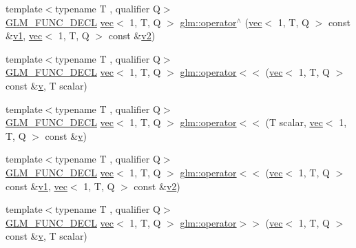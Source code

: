 \begin{DoxyCompactItemize}
\item 
{\footnotesize template$<$typename T , qualifier Q$>$ }\\\hyperlink{setup_8hpp_ab2d052de21a70539923e9bcbf6e83a51}{G\+L\+M\+\_\+\+F\+U\+N\+C\+\_\+\+D\+E\+CL} \hyperlink{structglm_1_1vec}{vec}$<$ 1, T, Q $>$ \hyperlink{group__ext__vec1_gaf70fee42d06c335b281793ffc5864b3e}{glm\+::operator$^\wedge$} (\hyperlink{structglm_1_1vec}{vec}$<$ 1, T, Q $>$ const \&\hyperlink{_s_d_l__opengl__glext_8h_a435c176a02c061b43e19bdf7c86cceae}{v1}, \hyperlink{structglm_1_1vec}{vec}$<$ 1, T, Q $>$ const \&\hyperlink{_s_d_l__opengl__glext_8h_a0928f6d0f0f794ba000a21dfae422136}{v2})
\item 
{\footnotesize template$<$typename T , qualifier Q$>$ }\\\hyperlink{setup_8hpp_ab2d052de21a70539923e9bcbf6e83a51}{G\+L\+M\+\_\+\+F\+U\+N\+C\+\_\+\+D\+E\+CL} \hyperlink{structglm_1_1vec}{vec}$<$ 1, T, Q $>$ \hyperlink{group__ext__vec1_gad0e63491d035c65d38f24bd45d2e19d3}{glm\+::operator$<$$<$} (\hyperlink{structglm_1_1vec}{vec}$<$ 1, T, Q $>$ const \&\hyperlink{_s_d_l__opengl_8h_a10a82eabcb59d2fcd74acee063775f90}{v}, T scalar)
\item 
{\footnotesize template$<$typename T , qualifier Q$>$ }\\\hyperlink{setup_8hpp_ab2d052de21a70539923e9bcbf6e83a51}{G\+L\+M\+\_\+\+F\+U\+N\+C\+\_\+\+D\+E\+CL} \hyperlink{structglm_1_1vec}{vec}$<$ 1, T, Q $>$ \hyperlink{group__ext__vec1_gad8117a2c6f59f08e76561309bcdffd1a}{glm\+::operator$<$$<$} (T scalar, \hyperlink{structglm_1_1vec}{vec}$<$ 1, T, Q $>$ const \&\hyperlink{_s_d_l__opengl_8h_a10a82eabcb59d2fcd74acee063775f90}{v})
\item 
{\footnotesize template$<$typename T , qualifier Q$>$ }\\\hyperlink{setup_8hpp_ab2d052de21a70539923e9bcbf6e83a51}{G\+L\+M\+\_\+\+F\+U\+N\+C\+\_\+\+D\+E\+CL} \hyperlink{structglm_1_1vec}{vec}$<$ 1, T, Q $>$ \hyperlink{group__ext__vec1_gad8eac20444d6f266c9b23a6a05e75a5a}{glm\+::operator$<$$<$} (\hyperlink{structglm_1_1vec}{vec}$<$ 1, T, Q $>$ const \&\hyperlink{_s_d_l__opengl__glext_8h_a435c176a02c061b43e19bdf7c86cceae}{v1}, \hyperlink{structglm_1_1vec}{vec}$<$ 1, T, Q $>$ const \&\hyperlink{_s_d_l__opengl__glext_8h_a0928f6d0f0f794ba000a21dfae422136}{v2})
\item 
{\footnotesize template$<$typename T , qualifier Q$>$ }\\\hyperlink{setup_8hpp_ab2d052de21a70539923e9bcbf6e83a51}{G\+L\+M\+\_\+\+F\+U\+N\+C\+\_\+\+D\+E\+CL} \hyperlink{structglm_1_1vec}{vec}$<$ 1, T, Q $>$ \hyperlink{group__ext__vec1_ga4fbe19c5f5fba90c89934a540de87bc5}{glm\+::operator$>$$>$} (\hyperlink{structglm_1_1vec}{vec}$<$ 1, T, Q $>$ const \&\hyperlink{_s_d_l__opengl_8h_a10a82eabcb59d2fcd74acee063775f90}{v}, T scalar)

\end{DoxyCompactItemize}
